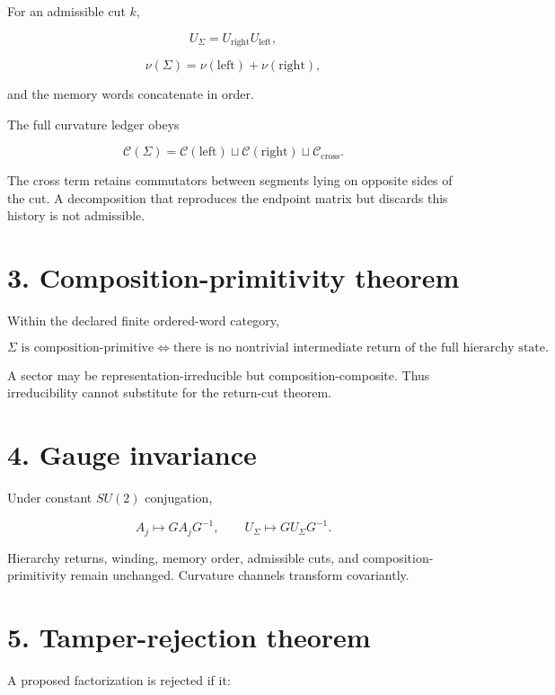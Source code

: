 For an admissible cut \(k\),

\[
U_\Sigma=U_{\mathrm{right}}U_{\mathrm{left}},
\]

\[
\nu(\Sigma)=\nu(\mathrm{left})+\nu(\mathrm{right}),
\]

and the memory words concatenate in order.

The full curvature ledger obeys

\[
\boxed{
\mathcal C(\Sigma)=
\mathcal C(\mathrm{left})
\sqcup
\mathcal C(\mathrm{right})
\sqcup
\mathcal C_{\mathrm{cross}}.
}
\]

The cross term retains commutators between segments lying on opposite sides of the cut. A decomposition that reproduces the endpoint matrix but discards this history is not admissible.

\hypertarget{composition-primitivity-theorem}{%
\section{3. Composition-primitivity theorem}\label{composition-primitivity-theorem}}

Within the declared finite ordered-word category,

\[
\boxed{
\Sigma\text{ is composition-primitive}
\iff
\text{there is no nontrivial intermediate return of the full hierarchy state}.
}
\]

A sector may be representation-irreducible but composition-composite. Thus irreducibility cannot substitute for the return-cut theorem.

\hypertarget{gauge-invariance}{%
\section{4. Gauge invariance}\label{gauge-invariance}}

Under constant \(SU(2)\) conjugation,

\[
A_j\mapsto GA_jG^{-1},
\qquad
U_\Sigma\mapsto GU_\Sigma G^{-1}.
\]

Hierarchy returns, winding, memory order, admissible cuts, and composition-primitivity remain unchanged. Curvature channels transform covariantly.

\hypertarget{tamper-rejection-theorem}{%
\section{5. Tamper-rejection theorem}\label{tamper-rejection-theorem}}

A proposed factorization is rejected if it:

